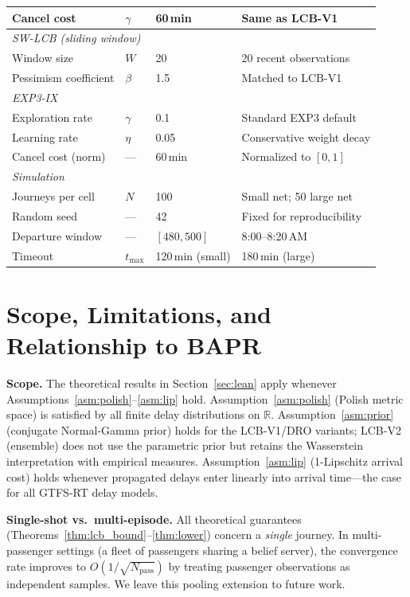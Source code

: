 \documentclass[11pt]{article}
\theoremstyle{definition}
\theoremstyle{remark}
\begin{document}
\begin{table}[h]
\begin{tabular}{l l l p{6.0cm}}
Cancel cost           & $\gamma$    & 60\,min & Same as LCB-V1 \\
\midrule
\multicolumn{4}{l}{\textit{SW-LCB (sliding window)}} \\
Window size           & $W$         & 20      & 20 recent observations \\
Pessimism coefficient & $\beta$     & 1.5     & Matched to LCB-V1 \\
\midrule
\multicolumn{4}{l}{\textit{EXP3-IX}} \\
Exploration rate      & $\gamma$    & 0.1     & Standard EXP3 default \\
Learning rate         & $\eta$      & 0.05    & Conservative weight decay \\
Cancel cost (norm)    & ---         & 60\,min & Normalized to $[0,1]$ \\
\midrule
\multicolumn{4}{l}{\textit{Simulation}} \\
Journeys per cell     & $N$         & 100     & Small net; 50 large net \\
Random seed           & ---         & 42      & Fixed for reproducibility \\
Departure window      & ---         & $[480, 500]$ & 8:00--8:20\,AM \\
Timeout               & $t_{\max}$  & 120\,min (small) & 180\,min (large) \\
\bottomrule
\end{tabular}
\end{table}

\section{Scope, Limitations, and Relationship to BAPR}
\label{app:scope}

\textbf{Scope.}
The theoretical results in Section~\ref{sec:lean} apply whenever
Assumptions~\ref{asm:polish}--\ref{asm:lip} hold.
Assumption~\ref{asm:polish} (Polish metric space) is satisfied by
all finite delay distributions on $\mathbb{R}$.
Assumption~\ref{asm:prior} (conjugate Normal-Gamma prior) holds for
the LCB-V1/DRO variants; LCB-V2 (ensemble) does not use the parametric
prior but retains the Wasserstein interpretation with empirical measures.
Assumption~\ref{asm:lip} (1-Lipschitz arrival cost) holds whenever
propagated delays enter linearly into arrival time---the case for all
GTFS-RT delay models.

\textbf{Single-shot vs.\ multi-episode.}
All theoretical guarantees (Theorems~\ref{thm:lcb_bound}--\ref{thm:lower})
concern a \emph{single} journey.
In multi-passenger settings (a fleet of passengers sharing a belief server),
the convergence rate improves to $O(1/\sqrt{N_{\mathrm{pass}}})$ by
treating passenger observations as independent samples.
We leave this pooling extension to future work.
\end{document}
